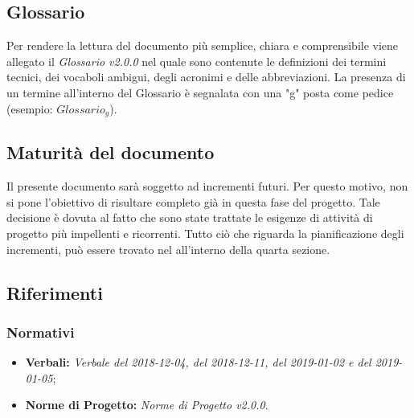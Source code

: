 \subsection{Glossario}
Per rendere la lettura del documento più semplice, chiara e comprensibile viene allegato il \emph{Glossario v2.0.0} nel quale sono contenute le definizioni dei termini tecnici, dei vocaboli ambigui, degli acronimi e delle abbreviazioni. La presenza di un termine all'interno del Glossario è segnalata con una "g" posta come pedice (esempio: $Glossario_{g}$).
\subsection{Maturità del documento}
Il presente documento sarà soggetto ad incrementi futuri. Per questo motivo, non si pone l'obiettivo di risultare completo già in questa fase del progetto.
Tale decisione è dovuta al fatto che sono state trattate le esigenze di attività di progetto più impellenti e ricorrenti.
Tutto ciò che riguarda la pianificazione degli incrementi, può essere trovato nel \emph{} all'interno della quarta sezione.  
\subsection{Riferimenti}

\subsubsection{Normativi}
\begin{itemize}
	\item \textbf{Verbali:} \emph{Verbale del 2018-12-04, del 2018-12-11, del 2019-01-02 e del 2019-01-05};
	\item \textbf{Norme di Progetto:} \emph{Norme di Progetto v2.0.0}.
\end{itemize}
